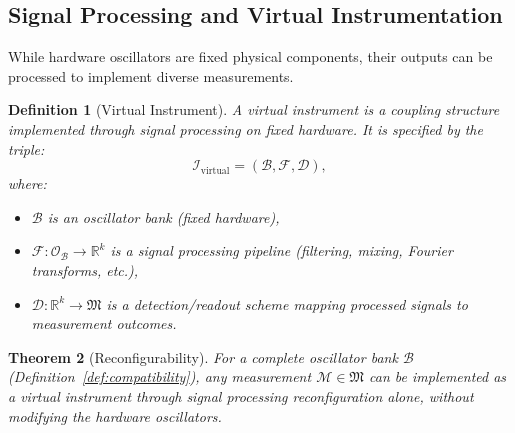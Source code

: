 \documentclass[twocolumn,10pt,a4paper]{article}
\newtheorem{theorem}{Theorem}[section]
\newtheorem{definition}[theorem]{Definition}
\theoremstyle{remark}
\newcommand{\oscillator}{\mathcal{O}}
\newcommand{\Reals}{\mathbb{R}}
\begin{document}
\subsection{Signal Processing and Virtual Instrumentation}

While hardware oscillators are fixed physical components, their outputs can be processed to implement diverse measurements.

\begin{definition}[Virtual Instrument]
\label{def:virtual_instrument}
A \emph{virtual instrument} is a coupling structure implemented through signal processing on fixed hardware. It is specified by the triple:
\begin{equation}
\mathcal{I}_{\text{virtual}} = (\mathcal{B}, \mathcal{F}, \mathcal{D}),
\end{equation}
where:
\begin{itemize}[noitemsep]
    \item $\mathcal{B}$ is an oscillator bank (fixed hardware),
    \item $\mathcal{F}: \oscillator_{\mathcal{B}} \to \Reals^k$ is a signal processing pipeline (filtering, mixing, Fourier transforms, etc.),
    \item $\mathcal{D}: \Reals^k \to \mathfrak{M}$ is a detection/readout scheme mapping processed signals to measurement outcomes.
\end{itemize}
\end{definition}

\begin{theorem}[Reconfigurability]
\label{thm:reconfigurability}
For a complete oscillator bank $\mathcal{B}$ (Definition~\ref{def:compatibility}), any measurement $\mathcal{M} \in \mathfrak{M}$ can be implemented as a virtual instrument through signal processing reconfiguration alone, without modifying the hardware oscillators.
\end{theorem}
\end{document}
